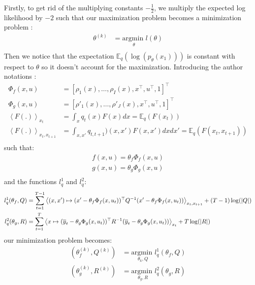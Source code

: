 Firstly, to get rid of the multiplying constants $-\frac{1}{2}$, we multiply the expected log likelihood by $-2$ such that our maximization problem becomes a minimization problem :
\begin{align*}
  \theta^{(k)} &= \underset{\theta}{\text{argmin }}l(\theta)\\
\end{align*}
Then we notice that the expectation $\mathbb{E}_q(\log(p_{\theta}(x_1)))$ is constant with respect to $\theta$ so it doesn't account for the maximization.
Introducing the author notations :
\begin{align*}
  \Phi_f(x, u) &= [\rho_1(x), \ldots , \rho_I(x), x^{\top}, u^{\top}, 1]^{\top}\\
  \Phi_g(x, u) &= [\rho'_1(x), \ldots , \rho'_J(x), x^{\top}, u^{\top}, 1]^{\top}\\
  \left< F(.) \right>_{x_t} &= \int_x{q_t(x) F(x) dx} = \mathbb{E}_q \left( F(x_t) \right)\\
  \left< F(.) \right>_{x_t,x_{t+1}} &= \int_{x, x'}{q_{t,t+1})(x, x') F(x,x') dx}dx' = \mathbb{E}_q \left( F(x_t, x_{t+1}) \right)\\
\end{align*} %
such that:
\begin{align*}
  f(x,u) = \theta_f \Phi_f(x, u)\\
  g(x,u) = \theta_g \Phi_g(x, u)\\
\end{align*}
and the functions $l^1_q$ and $l^2_q$:
\begin{align*}
  l^1_q(\theta_f, Q) &= \sum_{t=1}^{T-1}\left< (x, x') \mapsto (x' - \theta_f\Phi_f(x,u_t))^{\top} Q^{-1}(x' - \theta_f\Phi_f(x,u_t)) \right>_{x_t,x_{t+1}} + (T-1) \log( \mathbin{\vert} Q \mathbin{\vert} )
  \\
  l^2_q(\theta_g, R) &= \sum_{t=1}^{T}\left< x \mapsto (\overline{y}_{t} - \theta_g \Phi_g(x, u_t))^{\top} R^{-1} (\overline{y}_{t} - \theta_g \Phi_g(x, u_t)) \right>_{x_t} + T \log( \mathbin{\vert} R \mathbin{\vert} )
  \\
\end{align*}
our minimization problem becomes:
\begin{align*}
  \left(\theta_f^{(k)}, Q^{(k)}\right) &= \underset{\theta_k, Q}{\text{argmin }}l^1_q(\theta_f, Q)\\
  \left(\theta_g^{(k)}, R^{(k)}\right) &= \underset{\theta_g, R}{\text{argmin }}l^2_q(\theta_g, R)\\
\end{align*}
